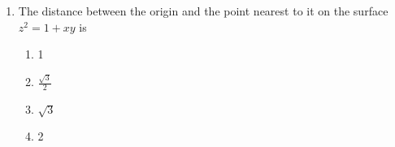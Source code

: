 \documentclass[journal]{IEEEtran}
\begin{document}
\begin{enumerate}
    

    \begin{multicols}{4}
    \begin{enumerate}
        \item $\frac{\pi}{2} - 1$
        \item $\frac{\pi}{2} + 1$
        \item $\frac{\pi}{2}$
        \item 1
    \end{enumerate}
    \end{multicols}
    
    \item The distance between the origin and the point nearest to it on the surface
    $z^2 = 1 + xy$ is
    \begin{multicols}{4}
    \begin{enumerate}
        \item 1
        \item $\frac{\sqrt{3}}{2}$
        \item $\sqrt{3}$
        \item 2
    \end{enumerate}
    \end{multicols}
\end{enumerate}
\end{document}
